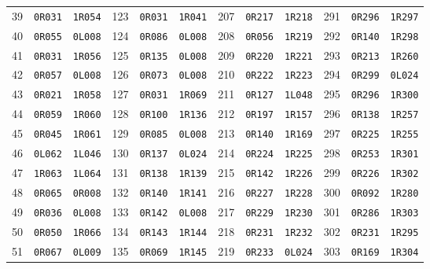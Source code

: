 \begin{longtable}{rll@{\qquad}rll@{\qquad}rll@{\qquad}rll}
39 & \texttt{0R031} & \texttt{1R054} & 123 & \texttt{0R031} & \texttt{1R041} & 207 & \texttt{0R217} & \texttt{1R218} & 291 & \texttt{0R296} & \texttt{1R297} \\
40 & \texttt{0R055} & \texttt{0L008} & 124 & \texttt{0R086} & \texttt{0L008} & 208 & \texttt{0R056} & \texttt{1R219} & 292 & \texttt{0R140} & \texttt{1R298} \\
41 & \texttt{0R031} & \texttt{1R056} & 125 & \texttt{0R135} & \texttt{0L008} & 209 & \texttt{0R220} & \texttt{1R221} & 293 & \texttt{0R213} & \texttt{1R260} \\
42 & \texttt{0R057} & \texttt{0L008} & 126 & \texttt{0R073} & \texttt{0L008} & 210 & \texttt{0R222} & \texttt{1R223} & 294 & \texttt{0R299} & \texttt{0L024} \\
43 & \texttt{0R021} & \texttt{1R058} & 127 & \texttt{0R031} & \texttt{1R069} & 211 & \texttt{0R127} & \texttt{1L048} & 295 & \texttt{0R296} & \texttt{1R300} \\
44 & \texttt{0R059} & \texttt{1R060} & 128 & \texttt{0R100} & \texttt{1R136} & 212 & \texttt{0R197} & \texttt{1R157} & 296 & \texttt{0R138} & \texttt{1R257} \\
45 & \texttt{0R045} & \texttt{1R061} & 129 & \texttt{0R085} & \texttt{0L008} & 213 & \texttt{0R140} & \texttt{1R169} & 297 & \texttt{0R225} & \texttt{1R255} \\
46 & \texttt{0L062} & \texttt{1L046} & 130 & \texttt{0R137} & \texttt{0L024} & 214 & \texttt{0R224} & \texttt{1R225} & 298 & \texttt{0R253} & \texttt{1R301} \\
47 & \texttt{1R063} & \texttt{1L064} & 131 & \texttt{0R138} & \texttt{1R139} & 215 & \texttt{0R142} & \texttt{1R226} & 299 & \texttt{0R226} & \texttt{1R302} \\
48 & \texttt{0R065} & \texttt{0R008} & 132 & \texttt{0R140} & \texttt{1R141} & 216 & \texttt{0R227} & \texttt{1R228} & 300 & \texttt{0R092} & \texttt{1R280} \\
49 & \texttt{0R036} & \texttt{0L008} & 133 & \texttt{0R142} & \texttt{0L008} & 217 & \texttt{0R229} & \texttt{1R230} & 301 & \texttt{0R286} & \texttt{1R303} \\
50 & \texttt{0R050} & \texttt{1R066} & 134 & \texttt{0R143} & \texttt{1R144} & 218 & \texttt{0R231} & \texttt{1R232} & 302 & \texttt{0R231} & \texttt{1R295} \\
51 & \texttt{0R067} & \texttt{0L009} & 135 & \texttt{0R069} & \texttt{1R145} & 219 & \texttt{0R233} & \texttt{0L024} & 303 & \texttt{0R169} & \texttt{1R304} \\

\end{longtable}

